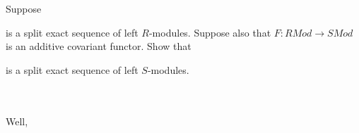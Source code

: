 Suppose

\begin{center}
\end{center}

is a split exact sequence of left $R$-modules. Suppose also that $F:RMod\to SMod$ is an additive
covariant functor. Show that

\begin{center}
\end{center}

is a split exact sequence of left $S$-modules.\\\\

\begin{solution}\renewcommand{\qedsymbol}{}\ \\
    Well,
\end{solution}